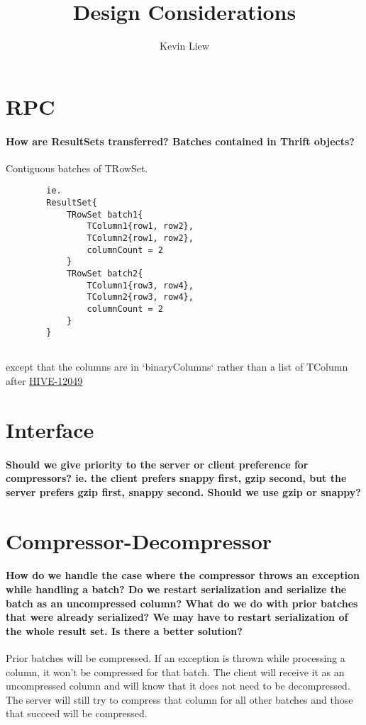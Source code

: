 \documentclass[11pt,a4paper]{article}
\title{Design Considerations}
\author{Kevin Liew}
\begin{document}
\maketitle

\section{RPC}
	\paragraph{How are ResultSets transferred? Batches contained in Thrift objects?}
	Contiguous batches of TRowSet.
	\begin{verbatim}
		ie.
		ResultSet{
		    TRowSet batch1{
		        TColumn1{row1, row2},
		        TColumn2{row1, row2},
		        columnCount = 2
		    }
		    TRowSet batch2{
		        TColumn1{row3, row4},
		        TColumn2{row3, row4},
		        columnCount = 2
		    }
		}
		
	\end{verbatim}
	except that the columns are in `binaryColumns` rather than a list of TColumn after \href{https://issues.apache.org/jira/browse/HIVE-12049}{HIVE-12049}

\section{Interface}
	\paragraph{Should we give priority to the server or client preference for compressors? ie. the client prefers snappy first, gzip second, but the server prefers gzip first, snappy second. Should we use gzip or snappy?}

\section{Compressor-Decompressor}
	\paragraph{How do we handle the case where the compressor throws an exception while handling a batch? Do we restart serialization and serialize the batch as an uncompressed column? What do we do with prior batches that were already serialized? We may have to restart serialization of the whole result set. Is there a better solution?}
	Prior batches will be compressed. If an exception is thrown while processing a column, it won't be compressed for that batch. The client will receive it as an uncompressed column and will know that it does not need to be decompressed. The server will still try to compress that column for all other batches and those that succeed will be compressed.
	
\end{document}
